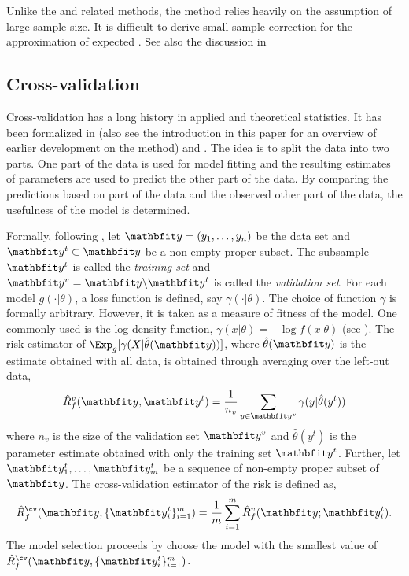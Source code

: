 Unlike the \aic and related methods, the \tic method relies heavily on the
assumption of large sample size. It is difficult to derive small sample
correction for the \tic approximation of expected \kld. See also the
discussion in \cite[][sec.~6.7.8]{Burnham:2002wc}

\subsection{Cross-validation}
\label{sub:Cross-validation}

Cross-validation has a long history in applied and theoretical statistics. It
has been formalized in \cite{Stone:1974vx} (also see the introduction in this
paper for an overview of earlier development on the method) and
\cite{Geisser:1975vx}. The idea is to split the data into two parts. One part
of the data is used for model fitting and the resulting estimates of
parameters are used to predict the other part of the data. By comparing the
predictions based on part of the data and the observed other part of the data,
the usefulness of the model is determined.

Formally, following \cite{Geisser:1975vx}, let $\data = (y_1,\dots,y_n)$ be
the data set and $\data^t\subset\data$ be a non-empty proper subset. The
subsample $\data^t$ is called the \emph{training set} and $\data^v =
\data\backslash\data^t$ is called the \emph{validation set}. For each model
$g(\cdot|\theta)$, a loss function is defined, say $\gamma(\cdot|\theta)$. The
choice of function $\gamma$ is formally arbitrary. However, it is taken as a
measure of fitness of the model. One commonly used is the log density
function, $\gamma(x|\theta) = -\log f(x|\theta)$ (see \cite{Stone:1977vx}).
The risk estimator of $\Exp_g[\gamma(X|\hat\theta(\data))]$, where
$\hat\theta(\data)$ is the estimate obtained with all data, is obtained
through averaging over the left-out data,
\begin{equation}
  \hat{R}_f^v(\data,\data^t) =
  \frac{1}{n_v}\sum_{y\in\data^v}\gamma(y|\hat\theta(y^t))
\end{equation}
where $n_v$ is the size of the validation set $\data^v$ and $\hat\theta(y^t)$
is the parameter estimate obtained with only the training set $\data^t$.
Further, let $\data_1^t,\dots,\data_m^t$ be a sequence of non-empty proper
subset of $\data$. The cross-validation estimator of the risk is defined as,
\begin{equation}
  \hat{R}_f^{\cv}(\data,\{\data_i^t\}_{i=1}^m) =
  \frac{1}{m}\sum_{i=1}^m \hat{R}_f^v(\data;\data_i^t).
\end{equation}
The model selection proceeds by choose the model with the smallest value of
$\hat{R}_f^{\cv}(\data,\{\data_i^t\}_{i=1}^m)$.

